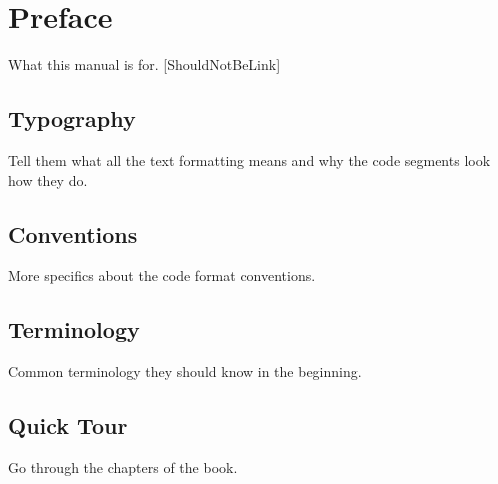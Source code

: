 \chapter*{Preface}

What this manual is for.  [ShouldNotBeLink]

\section*{Typography}

Tell them what all the text formatting means and why the code segments look how they do.

\section*{Conventions}

More specifics about the code format conventions.

\section*{Terminology}

Common terminology they should know in the beginning.

\section*{Quick Tour}

Go through the chapters of the book.

